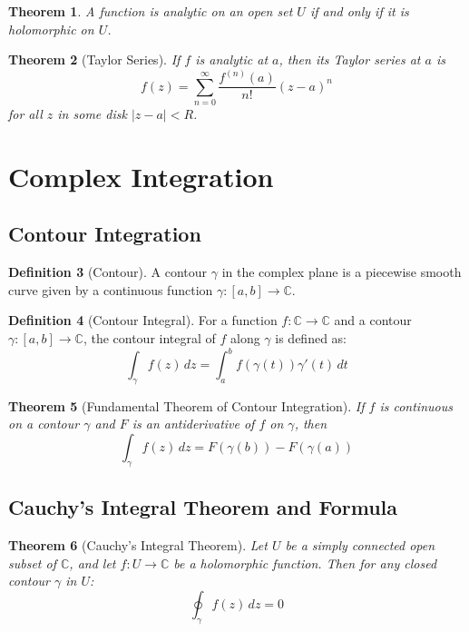 \documentclass[12pt,a4paper]{article}
\theoremstyle{plain}
\newtheorem{theorem}{Theorem}[section]
\theoremstyle{definition}
\newtheorem{definition}[theorem]{Definition}
\begin{document}
\begin{theorem}
A function is analytic on an open set $U$ if and only if it is holomorphic on $U$.
\end{theorem}

\begin{theorem}[Taylor Series]
If $f$ is analytic at $a$, then its Taylor series at $a$ is
\[f(z) = \sum_{n=0}^{\infty} \frac{f^{(n)}(a)}{n!} (z-a)^n\]
for all $z$ in some disk $|z-a| < R$.
\end{theorem}

\section{Complex Integration}

\subsection{Contour Integration}

\begin{definition}[Contour]
A contour $\gamma$ in the complex plane is a piecewise smooth curve given by a continuous function $\gamma: [a,b] \to \mathbb{C}$.
\end{definition}

\begin{definition}[Contour Integral]
For a function $f: \mathbb{C} \to \mathbb{C}$ and a contour $\gamma: [a,b] \to \mathbb{C}$, the contour integral of $f$ along $\gamma$ is defined as:
\[\int_{\gamma} f(z) \, dz = \int_{a}^{b} f(\gamma(t)) \gamma'(t) \, dt\]
\end{definition}

\begin{theorem}[Fundamental Theorem of Contour Integration]
If $f$ is continuous on a contour $\gamma$ and $F$ is an antiderivative of $f$ on $\gamma$, then
\[\int_{\gamma} f(z) \, dz = F(\gamma(b)) - F(\gamma(a))\]
\end{theorem}

\subsection{Cauchy's Integral Theorem and Formula}

\begin{theorem}[Cauchy's Integral Theorem]
Let $U$ be a simply connected open subset of $\mathbb{C}$, and let $f: U \to \mathbb{C}$ be a holomorphic function. Then for any closed contour $\gamma$ in $U$:
\[\oint_{\gamma} f(z) \, dz = 0\]
\end{theorem}
\end{document}
